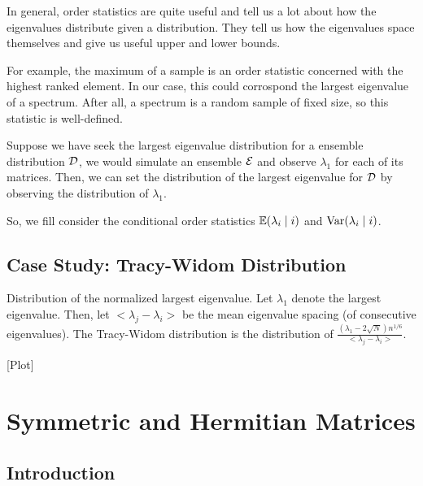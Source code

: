 In general, order statistics are quite useful and tell us a lot about how the eigenvalues distribute given a distribution. They tell us how the eigenvalues space themselves and give us useful upper and lower bounds. 

For example, the maximum of a sample is an order statistic concerned with the highest ranked element. In our case, this could corrospond the largest eigenvalue of a spectrum. After all, a spectrum is a random sample of fixed size, so this statistic is well-defined. 

\begin{example}
Suppose we have seek the largest eigenvalue distribution for a ensemble distribution $\mathcal{D}$, we would simulate an ensemble $\mathcal{E}$ and observe $\lambda_1$ for each of its matrices. Then, we can set the distribution of the largest eigenvalue for $\mathcal{D}$ by observing the distribution of $\lambda_1$. 
\end{example}

So, we fill consider the conditional order statistics $\mathbb{E}(\lambda_{i} \mid i)$ and $\text{Var}(\lambda_{i} \mid i)$.


\subsection{Case Study: Tracy-Widom Distribution}

Distribution of the normalized largest eigenvalue. Let $\lambda_1$ denote the largest eigenvalue. Then, let $<\lambda_j - \lambda_i>$ be the mean eigenvalue spacing (of consecutive eigenvalues). The Tracy-Widom distribution is the distribution of $\frac{(\lambda_1 - 2\sqrt{N})n^{1/6}}{<\lambda_j - \lambda_i>}$.

[Plot]


\section{Symmetric and Hermitian Matrices}

\subsection{Introduction}

